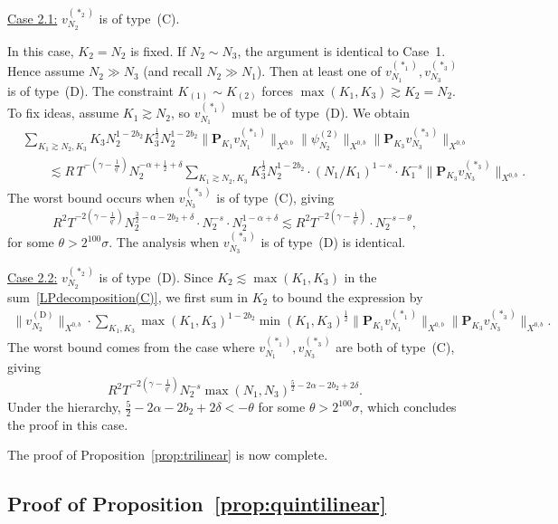 \documentclass[11pt,reqno,english]{amsart}
\numberwithin{equation}{section}
\theoremstyle{plain}
\theoremstyle{definition}
\theoremstyle{remark}
\begin{document}
\underline{Case 2.1:} $v_{N_2}^{(\ast_2)}$ is of type~(C).

In this case, $K_2=N_2$ is fixed. If $N_2\sim N_3$, the argument is identical to Case~1. Hence assume $N_2\gg N_3$ (and recall $N_2\gg N_1$). Then at least one of $v_{N_1}^{(\ast_1)},v_{N_3}^{(\ast_3)}$ is of type~(D). The constraint $K_{(1)}\sim K_{(2)}$ forces $\max(K_1,K_3)\gtrsim K_2=N_2$. To fix ideas, assume $K_1\gtrsim N_2$, so $v_{N_1}^{(\ast_1)}$ must be of type~(D). We obtain
\begin{align*}
	&\sum_{K_1\gtrsim N_2,K_3} K_3 N_2^{1-2b_2}K_3^{\frac{1}{2}}N_2^{1-2b_2} \|\mathbf{P}_{K_1}v_{N_1}^{(\ast_1)}\|_{X^{0,b}}\|\psi_{N_2}^{(2)}\|_{X^{0,b}}\|\mathbf{P}_{K_3}v_{N_3}^{(\ast_3)}\|_{X^{0,b}}\\
	&\qquad\lesssim R\, T^{-(\gamma-\frac{1}{q'})}
	N_2^{-\alpha+\frac{1}{2}+\delta}
	\sum_{K_1\gtrsim N_2,K_3} K_3^{\frac{1}{2}}N_2^{1-2b_2}\cdot (N_1/K_1)^{1-s}\cdot K_1^{-s}\|\mathbf{P}_{K_3}v_{N_3}^{(\ast_3)}\|_{X^{0,b}}.
\end{align*}
The worst bound occurs when $v_{N_3}^{(\ast_3)}$ is of type~(C), giving
\[
R^2 T^{-2(\gamma-\frac{1}{q'})}N_2^{\frac{3}{2}-\alpha-2b_2+\delta}\cdot N_2^{-s}\cdot N_2^{1-\alpha+\delta}\lesssim R^2 T^{-2(\gamma-\frac{1}{q'})}\cdot N_2^{-s-\theta},
\]
for some $\theta>2^{100}\sigma$. The analysis when $v_{N_3}^{(\ast_3)}$ is of type~(D) is identical.


\underline{Case 2.2:} $v_{N_2}^{(\ast_2)}$ is of type~(D). Since $K_2\lesssim \max(K_1,K_3)$ in the sum~\eqref{LPdecomposition(C)}, we first sum in $K_2$ to bound the expression by
\begin{align*}
	\|v_{N_2}^{(\mathrm{D})}\|_{X^{0,b}}\cdot \sum_{K_1,K_3}\max(K_1,K_3)^{1-2b_2}\min(K_1,K_3)^{\frac{1}{2}}	\|\mathbf{P}_{K_1}v_{N_1}^{(\ast_1)}\|_{X^{0,b}}\|\mathbf{P}_{K_3}v_{N_3}^{(\ast_3)}\|_{X^{0,b}}.
\end{align*}
The worst bound comes from the case where $v_{N_1}^{(\ast_1)},v_{N_3}^{(\ast_3)}$ are both of type~(C), giving
\[
R^2 T^{-2(\gamma-\frac{1}{q'})}N_2^{-s}\max(N_1,N_3)^{\frac{5}{2}-2\alpha-2b_2+2\delta}.
\]
Under the hierarchy, $\frac{5}{2}-2\alpha-2b_2+2\delta<-\theta$ for some $\theta>2^{100}\sigma$, which concludes the proof in this case.



The proof of Proposition~\ref{prop:trilinear} is now complete.
	
	
	\subsection{Proof of Proposition~\ref{prop:quintilinear}}
\end{document}
